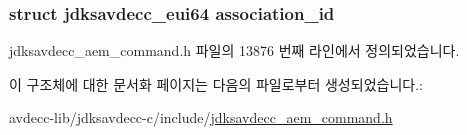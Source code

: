 \subsubsection[{\texorpdfstring{association\+\_\+id}{association_id}}]{\setlength{\rightskip}{0pt plus 5cm}struct {\bf jdksavdecc\+\_\+eui64} association\+\_\+id}\hypertarget{structjdksavdecc__aem__command__set__association__id__response_a0fa49c5118429af7a5ee7d71eada7b94}{}\label{structjdksavdecc__aem__command__set__association__id__response_a0fa49c5118429af7a5ee7d71eada7b94}


jdksavdecc\+\_\+aem\+\_\+command.\+h 파일의 13876 번째 라인에서 정의되었습니다.



이 구조체에 대한 문서화 페이지는 다음의 파일로부터 생성되었습니다.\+:\begin{DoxyCompactItemize}
\item 
avdecc-\/lib/jdksavdecc-\/c/include/\hyperlink{jdksavdecc__aem__command_8h}{jdksavdecc\+\_\+aem\+\_\+command.\+h}\end{DoxyCompactItemize}
